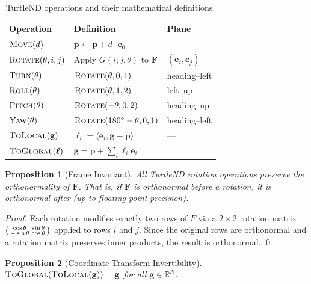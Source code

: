 \documentclass[11pt,letterpaper]{article}
\newtheorem{proposition}{Proposition}[section]
\newcommand{\R}{\mathbb{R}}
\newcommand{\fr}{\mathbf{F}}
\newcommand{\pos}{\mathbf{p}}
\newcommand{\basis}{\mathbf{e}}
\begin{document}
\begin{table}[h]
\centering
\caption{TurtleND operations and their mathematical definitions.}
\label{tab:ops}
\begin{tabular}{@{}lll@{}}
\toprule
\textbf{Operation} & \textbf{Definition} & \textbf{Plane} \\
\midrule
$\textsc{Move}(d)$ & $\pos \leftarrow \pos + d \cdot \basis_0$ & --- \\
$\textsc{Rotate}(\theta, i, j)$ & Apply $G(i, j, \theta)$ to $\fr$ & $(\basis_i, \basis_j)$ \\
$\textsc{Turn}(\theta)$ & $\textsc{Rotate}(\theta, 0, 1)$ & heading--left \\
$\textsc{Roll}(\theta)$ & $\textsc{Rotate}(\theta, 1, 2)$ & left--up \\
$\textsc{Pitch}(\theta)$ & $\textsc{Rotate}(-\theta, 0, 2)$ & heading--up \\
$\textsc{Yaw}(\theta)$ & $\textsc{Rotate}(180^\circ - \theta, 0, 1)$ & heading--left \\
$\textsc{ToLocal}(\mathbf{g})$ & $\ell_i = \langle \basis_i, \mathbf{g} - \pos \rangle$ & --- \\
$\textsc{ToGlobal}(\bm{\ell})$ & $\mathbf{g} = \pos + \sum_i \ell_i \basis_i$ & --- \\
\bottomrule
\end{tabular}
\end{table}

\begin{proposition}[Frame Invariant]
\label{prop:frame}
All TurtleND rotation operations preserve the orthonormality of $\fr$.
That is, if $\fr$ is orthonormal before a rotation, it is orthonormal
after (up to floating-point precision).
\end{proposition}

\begin{proof}
Each rotation modifies exactly two rows of $F$ via a $2 \times 2$ rotation
matrix $\begin{psmallmatrix} \cos\theta & \sin\theta \\ -\sin\theta & \cos\theta \end{psmallmatrix}$
applied to rows $i$ and $j$. Since the original rows are orthonormal and
a rotation matrix preserves inner products, the result is orthonormal. \qed
\end{proof}

\begin{proposition}[Coordinate Transform Invertibility]
\label{prop:coords}
$\textsc{ToGlobal}(\textsc{ToLocal}(\mathbf{g})) = \mathbf{g}$ for all $\mathbf{g} \in \R^N$.
\end{proposition}
\end{document}
